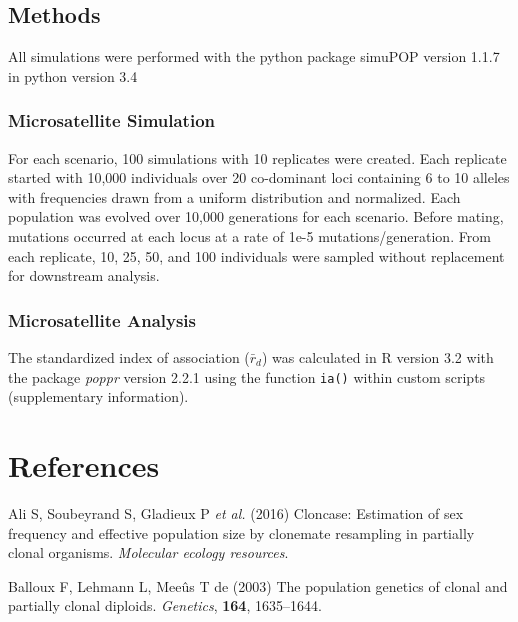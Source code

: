\documentclass[double,12pt]{beavtex}
\begin{document}
  \section{Methods}\label{methods}
  
  All simulations were performed with the python package simuPOP version
  1.1.7 in python version 3.4
  
  \subsection{Microsatellite Simulation}\label{microsatellite-simulation}
  
  For each scenario, 100 simulations with 10 replicates were created. Each
  replicate started with 10,000 individuals over 20 co-dominant loci
  containing 6 to 10 alleles with frequencies drawn from a uniform
  distribution and normalized. Each population was evolved over 10,000
  generations for each scenario. Before mating, mutations occurred at each
  locus at a rate of 1e-5 mutations/generation. From each replicate, 10,
  25, 50, and 100 individuals were sampled without replacement for
  downstream analysis.
  
  \subsection{Microsatellite Analysis}\label{microsatellite-analysis}
  
  The standardized index of association (\(\bar{r}_d\)) was calculated in
  R version 3.2 with the package \emph{poppr} version 2.2.1 using the
  function \texttt{ia()} within custom scripts (supplementary
  information).
  
  \backmatter
  
  \chapter{References}\label{references}
  
  \noindent
  
  \setlength{\parindent}{-0.20in} \setlength{\leftskip}{0.20in}
  \setlength{\parskip}{8pt}
  
  \hypertarget{refs}{}
  \hypertarget{ref-ali2016cloncase}{}
  Ali S, Soubeyrand S, Gladieux P \emph{et al.} (2016) Cloncase:
  Estimation of sex frequency and effective population size by clonemate
  resampling in partially clonal organisms. \emph{Molecular ecology
  resources}.
  
  \hypertarget{ref-balloux2003population}{}
  Balloux F, Lehmann L, Meeûs T de (2003) The population genetics of
  clonal and partially clonal diploids. \emph{Genetics}, \textbf{164},
  1635--1644.
  
\end{document}
